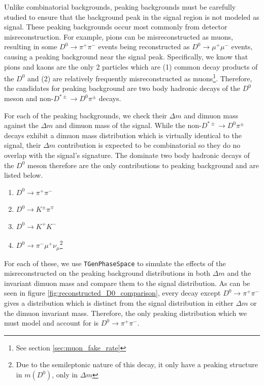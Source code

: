 Unlike combinatorial backgrounds, peaking backgrounds must be carefully studied to ensure that the background peak in the signal region is not modeled as signal. These peaking backgrounds occur most commonly from detector misreconstruction. For example, pions can be misreconstructed as muons, resulting in some $D^0 \to \pi^+ \pi^-$ events being reconstructed as $D^0 \to \mu^+ \mu^-$ events, causing a peaking background near the signal peak. Specifically, we know that pions and kaons are the only 2 particles which are (1) common decay products of the $D^0$ and (2) are relatively frequently misreconstructed as muons\footnote{See section \ref{sec:muon_fake_rate}}. Therefore, the candidates for peaking background are two body hadronic decays of the $D^0$ meson and non-$D^{*\pm} \to D^0 \pi^\pm$ decays. 

For each of the peaking backgrounds, we check their $\Delta m$ and dimuon mass against the $\Delta m$ and dimuon mass of the signal. While the non-$D^{*\pm} \to D^0 \pi^\pm$ decays exhibit a dimuon mass distribution which is virtually identical to the signal, their $\Delta m$ contribution is expected to be combinatorial so they do no overlap with the signal's signature. The dominate two body hadronic decays of the $D^0$ meson therefore are the only contributions to peaking background and are listed below.
\begin{enumerate}
    \item $D^0 \to \pi^+ \pi^-$
    \item $D^0 \to K^\pm \pi^\mp$
    \item $D^0 \to K^+ K^-$
    \item $D^0 \to \pi^- \mu^+ \nu_\mu$\footnote{Due to the semileptonic nature of this decay, it only have a peaking structure in $m(D^0)$, only in $\Delta m$}
\end{enumerate}
For each of these, we use \texttt{TGenPhaseSpace} to simulate the effects of the misreconstructed on the peaking background distributions in both $\Delta m$ and the invariant dimuon mass and compare them to the signal distribution. As can be seen in figure \ref{fig:reconstructed_D0_comparison}, every decay except $D^0 \to \pi^+ \pi^-$ gives a distribution which is distinct from the signal distribution in either $\Delta m$ or the dimuon invariant mass. Therefore, the only peaking distribution which we must model and account for is $D^0 \to \pi^+ \pi^-$. 

